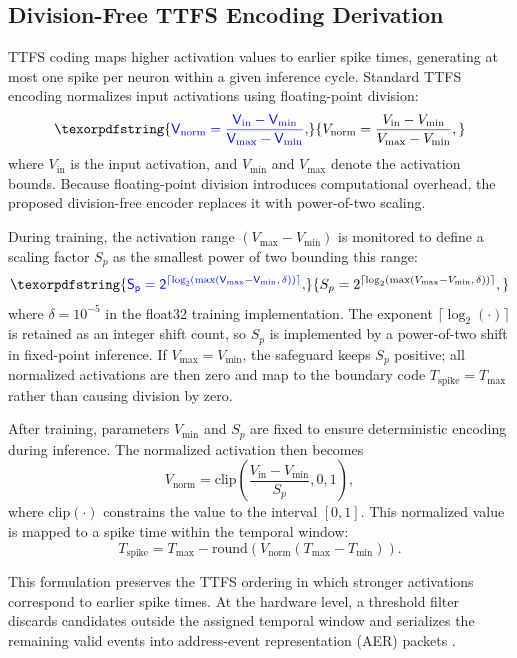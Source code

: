 \documentclass[12pt]{article}
\providecommand{\DIFaddtex}[1]{{\protect\color{blue}\sf #1}}
\providecommand{\DIFadd}[1]{\texorpdfstring{\DIFaddtex{#1}}{#1}}
\providecommand{\DIFaddbegin}{}
\providecommand{\DIFaddend}{}
\begin{document}
\subsection{Division-Free TTFS Encoding Derivation}

TTFS coding maps higher activation values to earlier spike times, generating at most one spike per neuron within a given inference cycle. Standard TTFS encoding normalizes input activations using floating-point division:
 \DIFaddbegin \begin{equation}
\DIFadd{V_{\mathrm{norm}} = \frac{V_{\mathrm{in}}-V_{\min}}{V_{\max}-V_{\min}},
}\end{equation}\DIFaddend 
where $V_{\mathrm{in}}$ is the input activation, and $V_{\min}$ and $V_{\max}$ denote the activation bounds. Because floating-point division introduces computational overhead, the proposed division-free encoder replaces it with power-of-two scaling. 

During training, the activation range $(V_{\max}-V_{\min})$ is monitored to define a scaling factor $S_p$ as the smallest power of two bounding this range:
 \DIFaddbegin \begin{equation}
\DIFadd{S_p = 2^{\lceil \log_2(\max(V_{\max}-V_{\min},\,\delta)) \rceil},
}\end{equation}\DIFaddend 
\DIFaddbegin \DIFadd{where $\delta=10^{-5}$ in the float32 training implementation. The exponent $\lceil\log_2(\cdot)\rceil$ is retained as an integer shift count, so $S_p$ is implemented by a power-of-two shift in fixed-point inference. If $V_{\max}=V_{\min}$, the safeguard keeps $S_p$ positive; all normalized activations are then zero and map to the boundary code $T_{\mathrm{spike}}=T_{\max}$ rather than causing division by zero.
}\DIFaddend 

After training, parameters $V_{\min}$ and $S_p$ are fixed to ensure deterministic encoding during inference. The normalized activation then becomes
\begin{equation}
V_{\mathrm{norm}} = \mathrm{clip}\left(\frac{V_{\mathrm{in}}-V_{\min}}{S_p},0,1\right),
\end{equation}
where $\mathrm{clip}(\cdot)$ constrains the value to the interval $[0,1]$. This normalized value is mapped to a spike time within the temporal window:
\begin{equation}
T_{\mathrm{spike}} = T_{\max}-\mathrm{round}\left(V_{\mathrm{norm}}(T_{\max}-T_{\min})\right).
\end{equation}

This formulation preserves the  \DIFaddbegin \DIFadd{TTFS ordering in which }\DIFaddend stronger activations correspond to earlier  \DIFaddbegin \DIFadd{spike times}\DIFaddend . At the hardware level, a threshold filter discards  \DIFaddbegin \DIFadd{candidates outside the assigned temporal window and serializes }\DIFaddend the remaining valid events into address-event representation (AER) packets .
\end{document}
